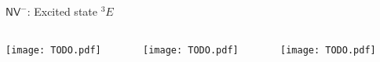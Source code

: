 \documentclass[]{beamer}
\begin{document}
\begin{frame}{ $ \mathsf{NV}^{-} $: Excited state $ ^3E $ }

    \begin{columns}
      \begin{column}{0.3\textwidth}
        \texttt{[image: TODO.pdf]}
      \end{column}
      \begin{column}{0.3\textwidth}
        \texttt{[image: TODO.pdf]}
      \end{column}
      \begin{column}{0.3\textwidth}
        \texttt{[image: TODO.pdf]}
      \end{column}
    \end{columns}

\end{frame}
\end{document}
